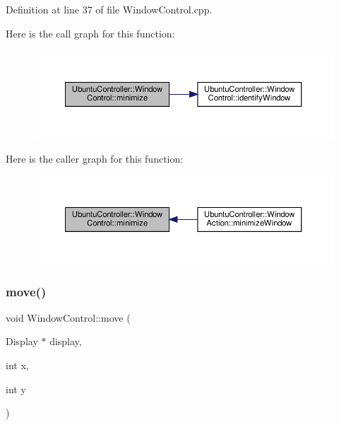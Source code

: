 Definition at line 37 of file Window\+Control.\+cpp.

Here is the call graph for this function\+:
\nopagebreak
\begin{figure}[H]
\begin{center}
\leavevmode
\includegraphics[width=350pt]{class_ubuntu_controller_1_1_window_control_abb8d0ae3c43be976259181c848fa4568_cgraph}
\end{center}
\end{figure}
Here is the caller graph for this function\+:
\nopagebreak
\begin{figure}[H]
\begin{center}
\leavevmode
\includegraphics[width=350pt]{class_ubuntu_controller_1_1_window_control_abb8d0ae3c43be976259181c848fa4568_icgraph}
\end{center}
\end{figure}
\mbox{\label{class_ubuntu_controller_1_1_window_control_a367c48d4f217a83225c8ade45e347884}} 
\subsubsection{\texorpdfstring{move()}{move()}}
{\footnotesize\ttfamily void Window\+Control\+::move (\begin{DoxyParamCaption}\item[{Display $\ast$}]{display,  }\item[{int}]{x,  }\item[{int}]{y }\end{DoxyParamCaption})}

